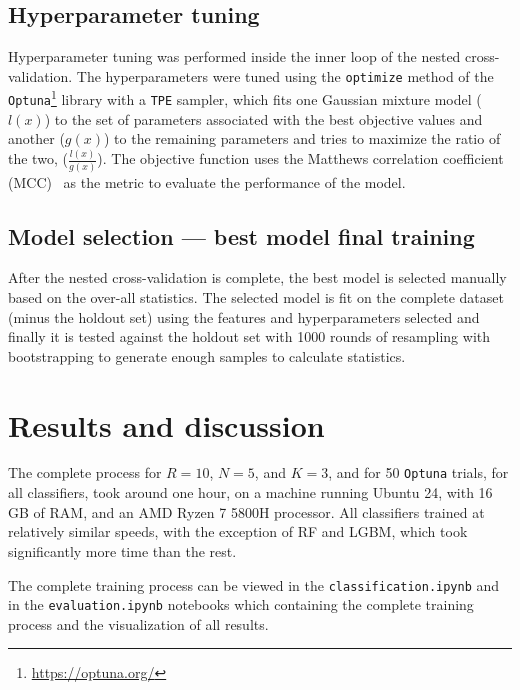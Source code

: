 \documentclass[12pt]{article}
\begin{document}
\subsection{Hyperparameter tuning}

Hyperparameter tuning was performed inside the inner loop of the nested
cross-validation. The hyperparameters were tuned using the \texttt{optimize}
method of the \texttt{Optuna}\footnote{%
\url{https://optuna.org/}} library with a \texttt{TPE} sampler, which fits
one Gaussian mixture model ($l(x)$) to the set of parameters associated with the
best objective values and another ($g(x)$) to the remaining parameters and tries
to maximize the ratio of the two, ($\frac{l(x)}{g(x)}$). The objective function
uses the Matthews correlation coefficient (MCC)~\cite{Chicco2023} as the metric
to evaluate the performance of the model.


\subsection{Model selection --- best model final training}

After the nested cross-validation is complete, the best model is selected
manually based on the over-all statistics. The selected model is fit on the
complete dataset (minus the holdout set) using the features and hyperparameters
selected and finally it is tested against the holdout set with 1000 rounds of
resampling with bootstrapping to generate enough samples to calculate
statistics.


\section{Results and discussion}

The complete process for $R=10$, $N=5$, and $K=3$, and for 50 \texttt{Optuna}
trials, for all classifiers, took around one hour, on a machine running Ubuntu
24, with 16 GB of RAM, and an AMD Ryzen 7 5800H processor. All classifiers
trained at relatively similar speeds, with the exception of RF and LGBM, which
took significantly more time than the rest.

The complete training process can be viewed in the \texttt{classification.ipynb}
and in the \texttt{evaluation.ipynb} notebooks which containing the complete
training process and the visualization of all results.
\end{document}
